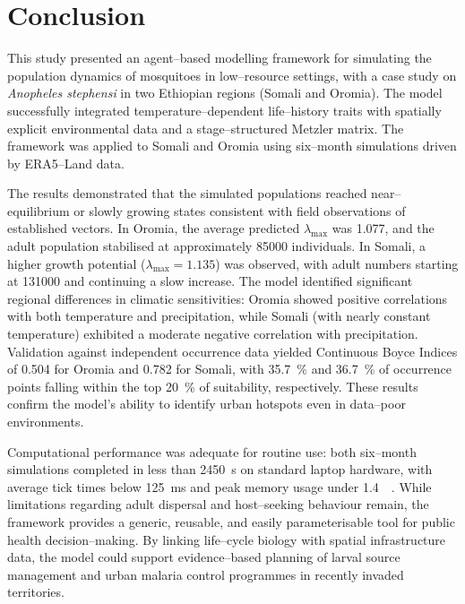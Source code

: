 \documentclass{article}
\begin{document}
\section{Conclusion}
\label{sec:conclusion}
\par
This study presented an agent--based modelling framework for simulating the population dynamics of mosquitoes in low--resource settings, 
with a case study on \textit{Anopheles stephensi} in two Ethiopian regions (Somali and Oromia). The model successfully integrated 
temperature--dependent life--history traits with spatially explicit environmental data and a stage--structured Metzler matrix. 
The framework was applied to Somali and Oromia using six--month simulations driven by ERA5--Land data. 
\par
The results demonstrated that the simulated populations reached near--equilibrium or slowly growing states consistent with field 
observations of established vectors. In Oromia, the average predicted $\lambda_{\max}$ was \num{1.077}, and the adult population 
stabilised at approximately \num{85000} individuals. In Somali, a higher growth potential ($\lambda_{\max} = 1.135$) was observed, 
with adult numbers starting at \num{131000} and continuing a slow increase. The model identified significant regional differences 
in climatic sensitivities: Oromia showed positive correlations with both temperature and precipitation, while Somali (with nearly 
constant temperature) exhibited a moderate negative correlation with precipitation. Validation against independent occurrence data 
yielded Continuous Boyce Indices of \num{0.504} for Oromia and \num{0.782} for Somali, with \qty{35.7}{\percent} and \qty{36.7}
{\percent} of occurrence points falling within the top \qty{20}{\percent} of suitability, respectively. These results confirm 
the model's ability to identify urban hotspots even in data--poor environments.
\par
Computational performance was adequate for routine use: both six--month simulations completed in less than \qty{2450}{\second} on 
standard laptop hardware, with average tick times below \qty{125}{\milli\second} and peak memory usage under \qty{1.4}{\giga\byte}. 
While limitations regarding adult dispersal and host--seeking behaviour remain, the framework provides a generic, reusable, and 
easily parameterisable tool for public health decision--making. By linking life--cycle biology with spatial infrastructure data, 
the model could support evidence--based planning of larval source management and urban malaria control programmes in recently 
invaded territories.
\end{document}
